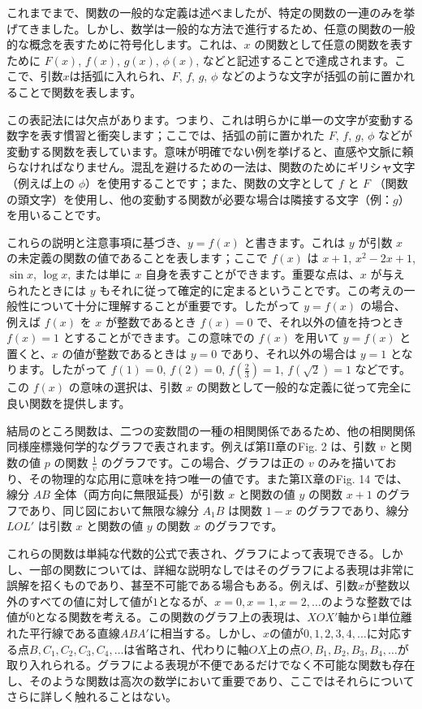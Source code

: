 \documentclass[a4paper,11pt,openany]{ltjsbook}
\begin{document}
これまでまで、関数の一般的な定義は述べましたが、特定の関数の一連のみを挙げてきました。しかし、数学は一般的な方法で進行するため、任意の関数の一般的な概念を表すために符号化します。これは、$x$ の関数として任意の関数を表すために $F(x)$, $f(x)$, $g(x)$, $\phi(x)$, などと記述することで達成されます。ここで、引数$x$は括弧に入れられ、$F$, $f$, $g$, $\phi$ などのような文字が括弧の前に置かれることで関数を表します。

この表記法には欠点があります。つまり、これは明らかに単一の文字が変動する数字を表す慣習と衝突します；ここでは、括弧の前に置かれた $F$, $f$, $g$, $\phi$ などが変動する関数を表しています。意味が明確でない例を挙げると、直感や文脈に頼らなければなりません。混乱を避けるための一法は、関数のためにギリシャ文字（例えば上の $\phi$）を使用することです；また、関数の文字として $f$ と $F$ （関数の頭文字）を使用し、他の変動する関数が必要な場合は隣接する文字（例：$g$）を用いることです。

これらの説明と注意事項に基づき、$y = f(x)$ と書きます。これは $y$ が引数 $x$ の未定義の関数の値であることを表します；ここで $f(x)$ は $x + 1$, $x^2 - 2x + 1$, $\sin x$, $\log x$, または単に $x$ 自身を表すことができます。重要な点は、$x$ が与えられたときには $y$ もそれに従って確定的に定まるということです。この考えの一般性について十分に理解することが重要です。したがって $y = f(x)$ の場合、例えば $f(x)$ を $x$ が整数であるとき $f(x) = 0$ で、それ以外の値を持つとき $f(x) = 1$ とすることができます。この意味での $f(x)$ を用いて $y = f(x)$ と置くと、$x$ の値が整数であるときは $y = 0$ であり、それ以外の場合は $y = 1$ となります。したがって $f(1) = 0$, $f(2) = 0$, $f(\frac{2}{3}) = 1$, $f(\sqrt{2}) = 1$ などです。この $f(x)$ の意味の選択は、引数 $x$ の関数として一般的な定義に従って完全に良い関数を提供します。

結局のところ関数は、二つの変数間の一種の相関関係であるため、他の相関関係同様座標幾何学的なグラフで表されます。例えば第II章のFig. 2 は、引数 $v$ と関数の値 $p$ の関数 $\frac{1}{v}$ のグラフです。この場合、グラフは正の $v$ のみを描いており、その物理的な応用に意味を持つ唯一の値です。また第IX章のFig. 14 では、線分 $AB$ 全体（両方向に無限延長）が引数 $x$ と関数の値 $y$ の関数 $x + 1$ のグラフであり、同じ図において無限な線分 $A_1B$ は関数 $1 - x$ のグラフであり、線分 $LOL'$ は引数 $x$ と関数の値 $y$ の関数 $x$ のグラフです。

これらの関数は単純な代数的公式で表され、グラフによって表現できる。しかし、一部の関数については、詳細な説明なしではそのグラフによる表現は非常に誤解を招くものであり、甚至不可能である場合もある。例えば、引数$x$が整数以外のすべての値に対して値が$1$となるが、$x = 0, x = 1, x = 2,\ldots$のような整数では値が$0$となる関数を考える。この関数のグラフ上の表現は、$XOX'$軸から$1$単位離れた平行線である直線$ABA'$に相当する。しかし、$x$の値が$0, 1, 2, 3, 4,\ldots$に対応する点$B, C_1, C_2, C_3, C_4,\ldots$は省略され、代わりに軸$OX$上の点$O, B_1, B_2, B_3, B_4,\ldots$が取り入れられる。グラフによる表現が不便であるだけでなく不可能な関数も存在し、そのような関数は高次の数学において重要であり、ここではそれらについてさらに詳しく触れることはない。
\end{document}
